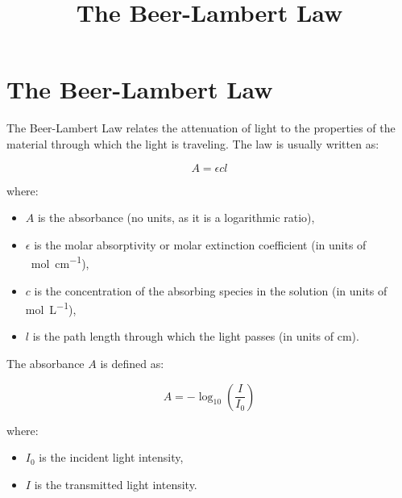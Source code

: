 \documentclass{article}
\begin{document}
\title{The Beer-Lambert Law}
\author{}
\date{}
\maketitle

\section*{The Beer-Lambert Law}

The Beer-Lambert Law relates the attenuation of light to the properties of the material through which the light is traveling. The law is usually written as:

\begin{equation}
A = \epsilon c l
\end{equation}

where:
\begin{itemize}
    \item $A$ is the absorbance (no units, as it is a logarithmic ratio),
    \item $\epsilon$ is the molar absorptivity or molar extinction coefficient (in units of \si{\per\mole\per\centi\meter}),
    \item $c$ is the concentration of the absorbing species in the solution (in units of \si{\mole\per\liter}),
    \item $l$ is the path length through which the light passes (in units of \si{\centi\meter}).
\end{itemize}

The absorbance $A$ is defined as:

\begin{equation}
A = -\log_{10}\left(\frac{I}{I_0}\right)
\end{equation}

where:
\begin{itemize}
    \item $I_0$ is the incident light intensity,
    \item $I$ is the transmitted light intensity.
\end{itemize}
\end{document}
